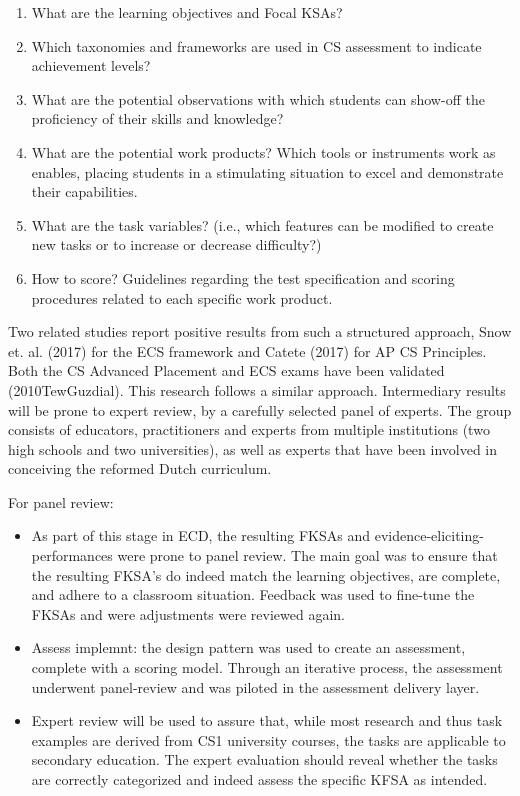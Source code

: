 \begin{enumerate}
\item What are the learning objectives and Focal KSAs?
\item Which taxonomies and frameworks are used in CS assessment to indicate achievement levels?
\item What are the potential observations with which students can show-off the proficiency of their skills and knowledge?
\item What are the potential work products? Which tools or instruments work as enables, placing students in a stimulating situation to excel and demonstrate their capabilities.
\item What are the task variables? (i.e., which features can be modified to create new tasks or to increase or decrease difficulty?)
\item How to score? Guidelines regarding the test specification and scoring procedures related to each specific work product.
\end{enumerate}





Two related studies report positive results from such a structured approach, Snow et. al. (2017) for the ECS framework and Catete (2017) for AP CS Principles. Both the CS Advanced Placement and ECS exams have been validated (2010TewGuzdial). This research follows a similar approach. Intermediary results will be prone to expert review, by a carefully selected panel of experts. The group consists of educators, practitioners and experts from multiple institutions (two high schools and two universities), as well as experts that have been involved in conceiving the reformed Dutch curriculum.


For panel review:
\begin{itemize}
\item As part of this stage in ECD, the resulting FKSAs and evidence-eliciting-performances were prone to panel review. The main goal was to ensure that the resulting FKSA’s do indeed match the learning objectives, are complete, and adhere to a classroom situation. Feedback was used to fine-tune the FKSAs and were adjustments were reviewed again.
\item Assess implemnt: the design pattern was used to create an assessment, complete with a scoring model. Through an iterative process, the assessment underwent panel-review and was piloted in the assessment delivery layer.
\item Expert review will be used to assure that, while most research and thus task examples are derived from CS1 university courses, the tasks are applicable to secondary education. The expert evaluation should reveal whether the tasks are correctly categorized and indeed assess the specific KFSA as intended.
\end{itemize}

